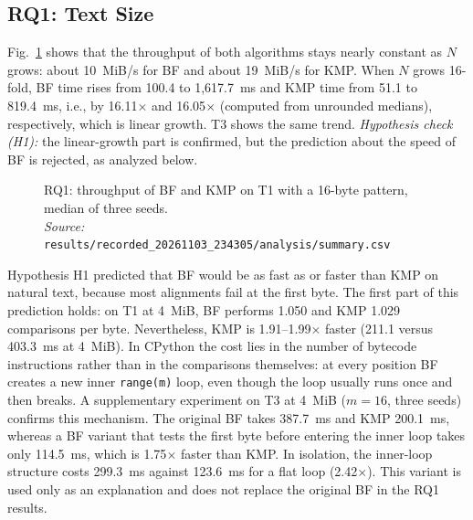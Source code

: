 \documentclass[conference]{IEEEtran}
\newcommand{\src}[1]{{\normalfont\footnotesize\emph{Source:}~\cite{data} {\scriptsize\texttt{#1}}}}
\newcommand{\RM}{results/recorded\_20261103\_234305}
\begin{document}
\subsection{RQ1: Text Size}
Fig.~\ref{fig:rq1} shows that the throughput of both algorithms stays nearly constant as $N$ grows: about 10~MiB/s for BF and about 19~MiB/s for KMP. When $N$ grows 16-fold, BF time rises from 100.4 to 1{,}617.7~ms and KMP time from 51.1 to 819.4~ms, i.e., by 16.11$\times$ and 16.05$\times$ (computed from unrounded medians), respectively, which is linear growth. T3 shows the same trend. \emph{Hypothesis check (H1):} the linear-growth part is confirmed, but the prediction about the speed of BF is rejected, as analyzed below.

\begin{figure}[t]
\centering
{}
\caption{RQ1: throughput of BF and KMP on T1 with a 16-byte pattern, median of three seeds.\\ \src{\RM/analysis/summary.csv}}
\label{fig:rq1}
\end{figure}

Hypothesis H1 predicted that BF would be as fast as or faster than KMP on natural text, because most alignments fail at the first byte. The first part of this prediction holds: on T1 at 4~MiB, BF performs 1.050 and KMP 1.029 comparisons per byte. Nevertheless, KMP is 1.91--1.99$\times$ faster (211.1 versus 403.3~ms at 4~MiB). In CPython the cost lies in the number of bytecode instructions rather than in the comparisons themselves: at every position BF creates a new inner \texttt{range(m)} loop, even though the loop usually runs once and then breaks. A supplementary experiment on T3 at 4~MiB ($m=16$, three seeds) confirms this mechanism. The original BF takes 387.7~ms and KMP 200.1~ms, whereas a BF variant that tests the first byte before entering the inner loop takes only 114.5~ms, which is 1.75$\times$ faster than KMP. In isolation, the inner-loop structure costs 299.3~ms against 123.6~ms for a flat loop (2.42$\times$). This variant is used only as an explanation and does not replace the original BF in the RQ1 results.
\end{document}
